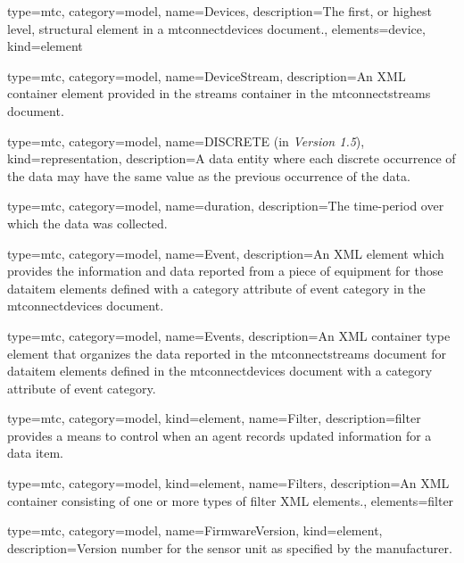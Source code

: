 {
  type=mtc,
  category=model,
  name={Devices},
  description={The first, or highest level, \gls{structural element} in a \gls{mtconnectdevices} document.},
  elements={\gls{device}},
  kind={element}
}


{
  type=mtc,
  category=model,
  name={DeviceStream},
  description={An XML container element provided in the \gls{streams} container in the \gls{mtconnectstreams} document.}
}



{
  type=mtc,
  category=model,
  name={DISCRETE (\normalfont \DEPRECATED in \textit{Version 1.5})},
  kind={representation},
  description={A \gls{data entity} where each discrete occurrence of the data may have the same value as the previous occurrence of the data.}
}

{
  type=mtc,
  category=model,
  name={duration},
  description={The time-period over which the data was collected.}
}



{
  type=mtc,
  category=model,
  name={Event},
  description={An XML element which provides the information and data reported from a piece of equipment for those \gls{dataitem} elements defined with a \gls{category} attribute of \gls{event category} in the \gls{mtconnectdevices} document.}
}


{
  type=mtc,
  category=model,
  name={Events},
  description={An XML container type element that organizes the data reported in the \gls{mtconnectstreams} document for \gls{dataitem} elements defined in the \gls{mtconnectdevices} document with a \gls{category} attribute of \gls{event category}.}
}


{
  type=mtc,
  category=model,
  kind={element},
  name={Filter},
  description={\gls{filter} provides a means to control when an \gls{agent} records updated information for a data item.}
}

{
  type=mtc,
  category=model,
  kind={element},
  name={Filters},
  description={An XML container consisting of one or more types of \gls{filter} XML elements.},
  elements={\gls{filter}}
}


{
  type=mtc,
  category=model,
  name={FirmwareVersion},
  kind={element},
  description={Version number for the sensor unit as specified by the manufacturer.}
}


